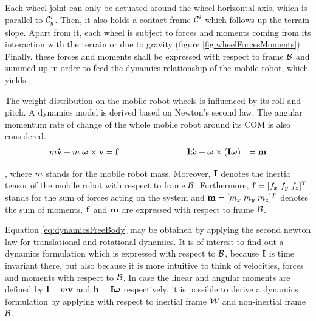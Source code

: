Each wheel joint can only be actuated around the wheel horizontal axis, which is parallel to $\mathcal{C}_y^i$. Then, it also holds a contact frame $\mathcal{C}^i$ which follows up the terrain slope. Apart from it, each wheel is subject to forces and moments coming from its interaction with the terrain or due to gravity (figure \ref{fig:wheelForcesMoments}). Finally, these forces and moments shall be expressed with respect to frame $\mathcal{B}$ and summed up in order to feed the dynamics relationship of the mobile robot, which yields .

The weight distribution on the mobile robot wheels is influenced by its roll and pitch. A dynamics model is derived based on Newton's second law. The angular momentum rate of change of the whole mobile robot around its COM is also considered.
\begin{equation}
	\begin{matrix}
		\Mass \mathbf{\dot{\LinVelocity}} + \Mass \; \bm{\AngVelocity} \times \mathbf{\LinVelocity} = \mathbf{\Force} & & & & & & & & \mathbf{\InertiaTensor} \bm{ \dot{\AngVelocity} } + \bm{\AngVelocity} \times (\mathbf{\InertiaTensor} \bm{\AngVelocity}) &= \mathbf{\Moment}
	\end{matrix}
	\label{eq:dynamicsFreeBody}
\end{equation}

\noindent , where $m$ stands for the mobile robot mass. Moreover, $\mathbf{I}$ denotes the inertia tensor of the mobile robot with respect to frame $\mathcal{B}$. Furthermore, $\mathbf{f} = [f_x\;f_y\;f_z]^T$ stands for the sum of forces acting on the system and $\mathbf{m} = [m_x \; m_y \; m_z]^T$ denotes the sum of moments. $\mathbf{f}$ and $\mathbf{m}$ are expressed with respect to frame $\mathcal{B}$. 

Equation \eqref{eq:dynamicsFreeBody} may be obtained by applying the second newton law for translational and rotational dynamics. It is of interest to find out a dynamics formulation which is expressed with respect to $\mathcal{B}$, because $\mathbf{I}$ is time invariant there, but also because it is more intuitive to think of velocities, forces and moments with respect to $\mathcal{B}$. In case the linear and angular moments are defined by $\mathbf{l} = m \mathbf{v}$ and $\mathbf{\angularMoment} = \mathbf{\InertiaTensor} \bm{\AngVelocity}$ respectively, it is possible to derive a dynamics formulation by applying  with respect to inertial frame $\mathcal{W}$ and non-inertial frame $\mathcal{B}$.

